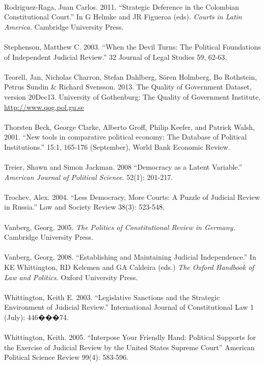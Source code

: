 \documentclass[12pt]{article}
\begin{document}
\\\noindent Rodriguez-Raga, Juan Carlos. 2011. ``Strategic Deference in the Colombian Constitutional Court.'' In G Helmke and JR Figueroa (eds). \textit{Courts in Latin America.} Cambridge University Press.\\

\\\noindent Stephenson, Matthew C. 2003. ``When the Devil Turns: The Political Foundations of Independent Judicial Review.'' 32 Journal of Legal Studies 59, 62-63.\\

\\\noindent Teorell, Jan, Nicholas Charron, Stefan Dahlberg, Sören Holmberg, Bo Rothstein, Petrus Sundin & Richard Svensson. 2013. The Quality of Government Dataset, version 20Dec13. University of Gothenburg: The Quality of Government Institute, \url{http://www.qog.pol.gu.se}\\

\\\noindent Thorsten Beck, George Clarke, Alberto Groff, Philip Keefer, and Patrick Walsh, 2001. ``New tools in comparative political economy: The Database of Political Institutions.'' 15:1, 165-176 (September), World Bank Economic Review.\\

\\\noindent Treier, Shawn and Simon Jackman. 2008 ``Democracy as a Latent Variable.'' \textit{American Journal of Political Science}. 52(1): 201-217.\\

\\\noindent Trochev, Alex. 2004. ``Less Democracy, More Courts: A Puzzle of Judicial Review in Russia.'' Law and Society Review 38(3): 523-548.\\

\\\noindent Vanberg, Georg. 2005. \textit{The Politics of Constitutional Review in Germany.} Cambridge University Press.\\

\\\noindent Vanberg, Georg. 2008. ``Establishing and Maintaining Judicial Independence.'' In KE Whittington, RD Kelemen and GA Caldeira (eds.) \textit{The Oxford Handbook of Law and Politics.} Oxford University Press.\\

\\\noindent Whittington, Keith E. 2003. ``Legislative Sanctions and the Strategic Environment of Judicial Review.'' International Journal of Constitutional Law 1 (July): 446���74.\\

\\\noindent Whittington, Keith. 2005. ``Interpose Your Friendly Hand: Political Supports for the Exercise of Judicial Review by the United States Supreme Court'' American Political Science Review 99(4): 583-596.\\
\end{document}
